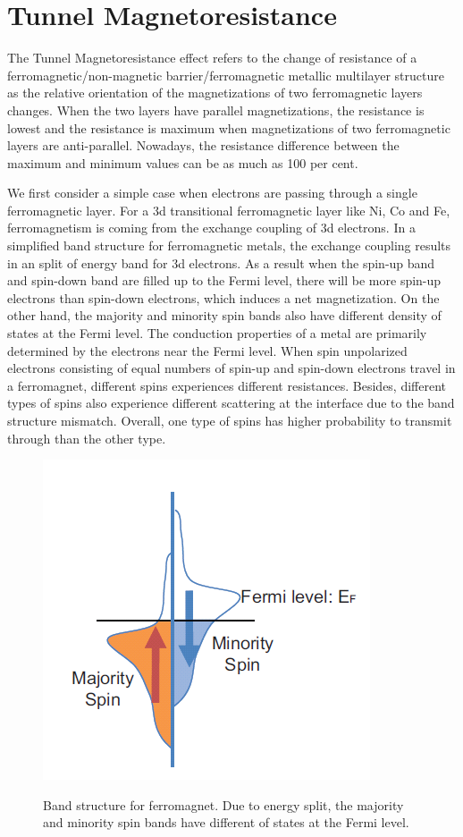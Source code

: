 \section{Tunnel Magnetoresistance}

The Tunnel Magnetoresistance effect\cite{TMR} refers to the change of resistance of a ferromagnetic/non-magnetic barrier/ferromagnetic metallic multilayer structure as the relative orientation of the magnetizations of two ferromagnetic layers changes. When the two layers have parallel magnetizations, the resistance is lowest and the resistance is maximum when magnetizations of two ferromagnetic layers are anti-parallel. Nowadays, the resistance difference between the maximum and minimum values can be as much as 100 per cent.

We first consider a simple case when electrons are passing through a single ferromagnetic layer. For a 3d transitional ferromagnetic layer like Ni, Co and Fe, ferromagnetism is coming from the exchange coupling of 3d electrons. In a simplified band structure for ferromagnetic metals, the exchange coupling results in an split of energy band for 3d electrons. As a result when the spin-up band and spin-down band are filled up to the Fermi level, there will be more spin-up electrons than spin-down electrons, which induces a net magnetization. On the other hand, the majority and minority spin bands also have different density of states at the Fermi level. The conduction properties of a metal are primarily determined by the electrons near the Fermi level. When spin unpolarized electrons consisting of equal numbers of spin-up and spin-down electrons travel in a ferromagnet, different spins experiences different resistances. Besides, different types of spins also experience different scattering at the interface due to the band structure mismatch. Overall, one type of spins has higher probability to transmit through than the other type.

\begin{figure}[!ht]
\centering
\includegraphics{fig/Fermi.PNG}
\label{Fermi}
\caption{Band structure for ferromagnet. Due to energy split, the majority and minority spin bands have different of states at the Fermi level.}

\end{figure}




